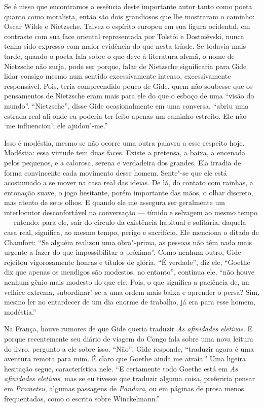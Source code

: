 Se é nisso que encontramos a essência deste importante autor tanto como
poeta quanto como moralista, então são dois grandiosos que lhe mostraram o
caminho: Oscar Wilde e Nietzsche. Talvez o espírito
europeu em sua figura ocidental, em contraste com sua face oriental
representada por Tolstói e Dostoiévski, nunca tenha sido expresso com
maior evidência do que nesta tríade. Se todavia mais tarde, quando o
poeta fala sobre o que deve à literatura alemã, o nome de
Nietzsche não surja, pode ser porque, falar de Nietzsche
significaria para Gide lidar consigo mesmo num sentido excessivamente
intenso, excessivamente responsável. Pois, teria compreendido pouco de
Gide, quem não soubesse que os pensamentos de Nietzsche eram mais para
ele do que o esboço de uma ``visão do mundo''. ``Nietzsche'', disse Gide
ocasionalmente em uma conversa, ``abriu uma estrada real ali onde eu
poderia ter feito apenas um caminho estreito. Ele não `me influenciou';
ele ajudou"-me.''

Isso é modéstia, mesmo se não ocorre uma outra palavra a esse respeito hoje.
Modéstia: essa virtude tem duas faces. Existe a pretensa, a baixa, a
encenada pelos pequenos, e a calorosa, serena e verdadeira dos grandes. Ela
irradia de forma convincente cada movimento desse homem. Sente"-se que ele está
acostumado a se mover na casa real das ideias. De lá, do contato com
rainhas, a entonação suave, o jogo hesitante, porém importante das
mãos, o olhar discreto, mas atento de seus olhos. E quando ele me assegura
ser geralmente um interlocutor desconfortável na conversação --- tímido e
selvagem ao mesmo tempo --- entendo: para ele, sair do círculo da existência habitual e
solitária, daquela casa real, significa, ao mesmo
tempo, perigo e sacrifício. Ele menciona o ditado de Chamfort: ``Se alguém
realizou uma obra"-prima, as pessoas não têm nada mais urgente a fazer do
que impossibilitar a próxima''. Como nenhum outro, Gide rejeitou
vigorosamente honras e títulos de glória. ``É verdade'', diz ele,
``Goethe diz que apenas os mendigos são modestos, no entanto'', continua
ele, ``não houve nenhum gênio mais modesto do que ele. Pois, o que
significa a paciência de, na velhice extrema, subordinar"-se a uma ordem
mais baixa e aprender o persa? Sim, mesmo ler no entardecer de um dia
enorme de trabalho, já era para esse homem, modéstia.''

Na França, houve rumores de que Gide queria traduzir \emph{As afinidades
eletivas}. E porque recentemente seu diário de viagem do Congo fala
sobre uma nova leitura do livro, pergunto a ele sobre isso. ``Não'',
Gide responde, ``traduzir agora é uma aventura remota para mim. É claro
que Goethe ainda me atraía.'' Uma ligeira hesitação segue, característica
nele. ``E certamente todo Goethe está em \emph{As afinidades
eletivas}, mas se eu tivesse que traduzir alguma coisa, preferiria
pensar em \emph{Prometeu}, algumas passagens de \emph{Pandora}, ou em
páginas de prosa menos frequentadas, como o escrito sobre Winckelmann.''

